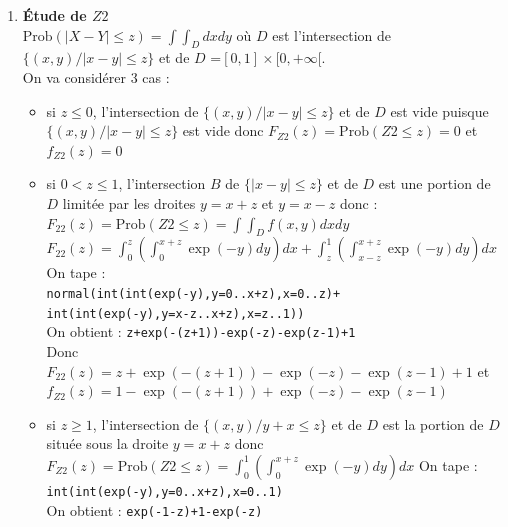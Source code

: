 \documentclass[a4paper,11pt]{book}
\begin{document}
\begin{enumerate}
\begin{enumerate}
{\bf Calcul de $V(Z1)$ et de $\sigma(Z1)$}\\
On a :\\
$\displaystyle V(Z1)=\int_{-\infty}^{+\infty}(z-3/2)^2f_{Z1}(z)dz=\int_0^1(z-3/2)^2(1-\exp(-z))dz+$
$\displaystyle \int_1^{+\infty}(z-3/2)^2(\exp(-z+1)-\exp(-z))dz$\\
On tape :\\
{\tt int((z-3/2)\verb|^|2*(1-exp(-z)),z=0..1)+\\int((z-3/2)\verb|^|2*(exp(-z+1)-exp(-z)),z=1..inf)}\\
On obtient : {\tt 13/12}\\
Donc $V(Z1)=13/12$ et $\sigma(Z1)=\sqrt 13/(2\sqrt 3)$.
\item {\bf \'Etude de $Z2$}\\
$\mbox{Prob}(|X-Y|\leq z)=\int\int_Ddxdy$ o\`u $D$ est l'intersection de 
$\{(x,y) / |x-y|\leq z\}$ et de $D$ =$[0,1]\times [0,+\infty[$.\\
On va consid\'erer 3 cas :
\begin{itemize}
\item si $z\leq 0$, l'intersection de $\{(x,y) / |x-y|\leq z\}$ et de 
$D$ est vide puisque  $\{(x,y) / |x-y|\leq z\}$ est vide donc
 $F_{Z2}(z)=\mbox{Prob}(Z2\leq z)=0$ et $f_{Z2}(z)=0$
\item si $0<z\leq 1$, l'intersection $B$ de $\{|x-y| \leq z\}$ et de $D$ est une portion de $D$ limit\'ee par les droites $y=x+z$ et 
$y=x-z$  donc :\\
$\displaystyle F_{22}(z)=\mbox{Prob}(Z2\leq z)=\int\int_Df(x,y)dxdy$\\
$\displaystyle F_{22}(z)=\int_0^z(\int_0^{x+z}\exp(-y)dy)dx+\int_z^1(\int_{x-z}^{x+z}\exp(-y)dy)dx$ 
On tape :\\
{\tt normal(int(int(exp(-y),y=0..x+z),x=0..z)+\\int(int(exp(-y),y=x-z..x+z),x=z..1))}\\
On obtient : {\tt z+exp(-(z+1))-exp(-z)-exp(z-1)+1}\\
Donc $F_{22}(z)=z+\exp(-(z+1))-\exp(-z)-\exp(z-1)+1$ et 
$f_{Z2}(z)=1-\exp(-(z+1))+\exp(-z)-\exp(z-1)$
\item si $z\geq 1$, l'intersection de $\{(x,y) / y+x\leq z\}$ et de $D$ est la portion de $D$ situ\'ee sous la droite $y=x+z$ donc
$\displaystyle F_{Z2}(z)=\mbox{Prob}(Z2\leq z)=\int_0^1(\int_0^{x+z}\exp(-y)dy)dx$ 
On tape :\\
{\tt int(int(exp(-y),y=0..x+z),x=0..1)}\\
On obtient : {\tt exp(-1-z)+1-exp(-z)}\\

\end{itemize}
\end{enumerate}
\end{enumerate}
\end{document}
